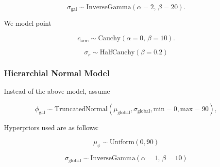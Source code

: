\begin{equation}
\sigma_\mathrm{gal} \sim \mathrm{InverseGamma}(\alpha=2,\,\beta=20).
\end{equation}

We model point

\begin{equation}
c_\mathrm{arm} \sim \mathrm{Cauchy}(\alpha=0,\,\beta=10).
\end{equation}

\begin{equation}
\sigma_r \sim \mathrm{HalfCauchy}(\beta=0.2)
\end{equation}

\subsubsection{Hierarchial Normal Model}

Instead of the above model, assume

\begin{equation}
\phi_\mathrm{gal} \sim \mathrm{TruncatedNormal}(\mu_\mathrm{global}, \sigma_\mathrm{global}, \mathrm{min}=0, \mathrm{max}=90),
\end{equation}

Hyperpriors used are as follows:

\begin{equation}
\mu_\phi \sim \mathrm{Uniform}(0, 90)
\end{equation}

\begin{equation}
\sigma_\mathrm{global} \sim \mathrm{InverseGamma}(\alpha=1,\,\beta=10)
\end{equation}
